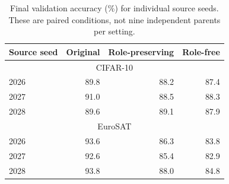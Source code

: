 \begin{table}[t]
\centering\footnotesize
\caption{Final validation accuracy (\%) for individual source seeds. These are paired conditions, not nine independent parents per setting.}
\label{tab:seeds}
\begin{tabular}{lrrr}
\toprule
Source seed & Original & Role-preserving & Role-free \\
\midrule
\multicolumn{4}{c}{CIFAR-10} \\
2026 & 89.8 & 88.2 & 87.4 \\
2027 & 91.0 & 88.5 & 88.3 \\
2028 & 89.6 & 89.1 & 87.9 \\
\multicolumn{4}{c}{EuroSAT} \\
2026 & 93.6 & 86.3 & 83.8 \\
2027 & 92.6 & 85.4 & 82.9 \\
2028 & 93.8 & 88.0 & 84.8 \\
\bottomrule
\end{tabular}
\end{table}
